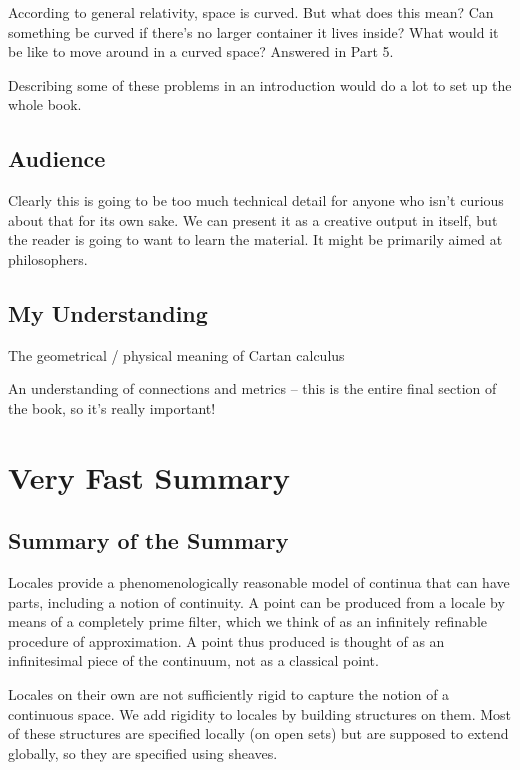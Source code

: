 \documentclass[oneside,english]{amsbook}
\numberwithin{section}{chapter}
\theoremstyle{plain}
\theoremstyle{definition}
\begin{document}
According to general relativity, space is curved. But what does this mean? Can something be curved if there's no larger container it lives inside? What would it be like to move around in a curved space? Answered in Part 5.

Describing some of these problems in an introduction would do a lot to set up the whole book.

\section{Audience}

Clearly this is going to be too much technical detail for anyone who isn't curious about that for its own sake. We can present it as a creative output in itself, but the reader is going to want to learn the material. It might be primarily aimed at philosophers.

\section{My Understanding}

The geometrical / physical meaning of Cartan calculus

An understanding of connections and metrics -- this is the entire final section of the book, so it's really important!

\chapter*{Very Fast Summary}

\section{Summary of the Summary}

Locales provide a phenomenologically reasonable model of continua that can have parts, including a notion of continuity. A point can be produced from a locale by means of a completely prime filter, which we think of as an infinitely refinable procedure of approximation. A point thus produced is thought of as an infinitesimal piece of the continuum, not as a classical point.

Locales on their own are not sufficiently rigid to capture the notion of a continuous space. We add rigidity to locales by building structures on them. Most of these structures are specified locally (on open sets) but are supposed to extend globally, so they are specified using sheaves.
\end{document}
